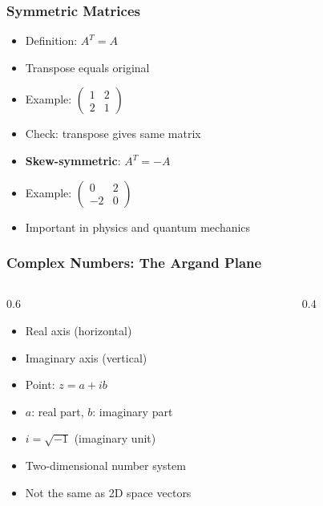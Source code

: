 \begin{frame}[fragile]\frametitle{Symmetric Matrices}
  \begin{itemize}
    \item Definition: $A^T = A$
    \item Transpose equals original
    \item Example: $\begin{pmatrix} 1 & 2 \\ 2 & 1 \end{pmatrix}$
    \item Check: transpose gives same matrix
    \item \textbf{Skew-symmetric}: $A^T = -A$
    \item Example: $\begin{pmatrix} 0 & 2 \\ -2 & 0 \end{pmatrix}$
    \item Important in physics and quantum mechanics
  \end{itemize}
\end{frame}

\begin{frame}[fragile]\frametitle{Complex Numbers: The Argand Plane}
  \begin{columns}
    \begin{column}[T]{0.6\linewidth}
      \begin{itemize}
        \item Real axis (horizontal)
        \item Imaginary axis (vertical)
        \item Point: $z = a + ib$
        \item $a$: real part, $b$: imaginary part
        \item $i = \sqrt{-1}$ (imaginary unit)
        \item Two-dimensional number system
        \item Not the same as 2D space vectors
      \end{itemize}
    \end{column}
    \begin{column}[T]{0.4\linewidth}
      \begin{center}
      \end{center}
    \end{column}
  \end{columns}
\end{frame}


